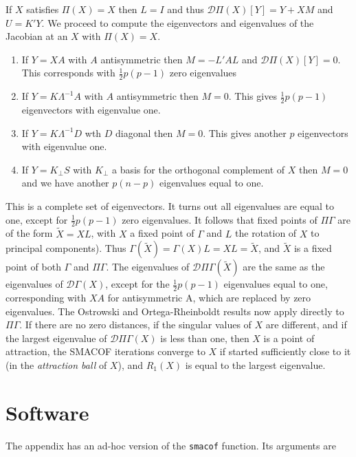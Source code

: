\documentclass[
  12pt,
]{article}
\providecommand{\tightlist}{%
  \setlength{\itemsep}{0pt}\setlength{\parskip}{0pt}}
\begin{document}
If \(X\) satisfies \(\Pi(X)=X\) then \(L=I\) and thus \(\mathcal{D}\Pi(X)[Y]=Y+XM\) and \(U=K'Y\).
We proceed to compute the eigenvectors and eigenvalues of the Jacobian at an \(X\) with
\(\Pi(X)=X\).

\begin{enumerate}
\def\labelenumi{\arabic{enumi}.}
\tightlist
\item
  If \(Y=XA\) with \(A\) antisymmetric then \(M=-L'AL\) and \(\mathcal{D}\Pi(X)[Y]=0\).
  This corresponds with \(\frac12 p(p-1)\) zero eigenvalues
\item
  If \(Y=K\Lambda^{-1}A\) with \(A\) antisymmetric then \(M=0\). This gives \(\frac12 p(p-1)\)
  eigenvectors with eigenvalue one.
\item
  If \(Y=K\Lambda^{-1}D\) wth \(D\) diagonal then \(M=0\). This gives another \(p\) eigenvectors with eigenvalue one.
\item
  If \(Y=K_\perp S\) with \(K_\perp\) a basis for the orthogonal complement of \(X\) then \(M=0\) and we have another \(p(n-p)\) eigenvalues equal to one.
\end{enumerate}

This is a complete set of eigenvectors. It turns out all eigenvalues are equal to one, except for \(\frac12 p(p-1)\) zero eigenvalues. It follows that fixed points of
\(\Pi\Gamma\) are of the form \(\tilde X=XL\), with \(X\) a fixed point of \(\Gamma\) and \(L\) the rotation of \(X\) to principal components). Thus \(\Gamma(\tilde X)=\Gamma(X)L=XL=\tilde X\), and \(\tilde X\) is a fixed point of both \(\Gamma\) and \(\Pi\Gamma\). The eigenvalues of
\(\mathcal{D}\Pi\Gamma(\tilde X)\) are the same as the eigenvalues of \(\mathcal{D}\Gamma(X)\), except for the \(\frac12 p(p-1)\) eigenvalues equal to one, corresponding with \(XA\) for antisymmetric A, which are replaced by zero eigenvalues. The Ostrowski and Ortega-Rheinboldt
results now apply directly to \(\Pi\Gamma\). If there are no zero distances, if the singular values of \(X\) are different, and if the largest eigenvalue of \(\mathcal{D}\Pi\Gamma(X)\) is less than one, then \(X\) is a point of attraction, the SMACOF iterations converge to \(X\) if started sufficiently close to it (in the \emph{attraction ball} of \(X\)), and \(R_1(X)\) is equal to the largest eigenvalue.

\section{Software}\label{software}

The appendix has an ad-hoc version of the \texttt{smacof} function. Its arguments are
\end{document}

